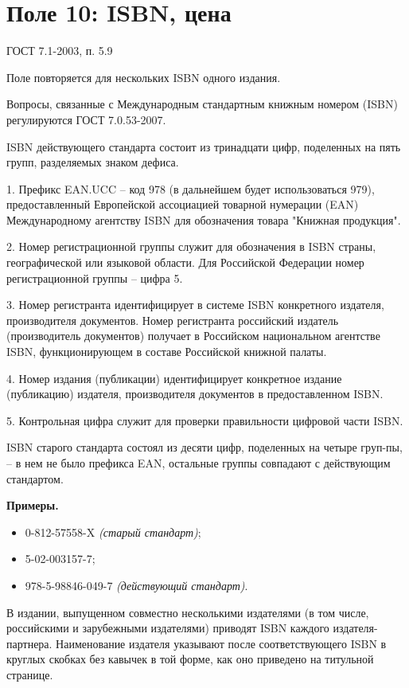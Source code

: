 \chapter*{Поле 10: ISBN, цена}

ГОСТ 7.1-2003, п. 5.9

Поле повторяется для нескольких ISBN одного издания.
 
Вопросы, связанные с Международным стандартным книжным номером (ISBN) регулируются ГОСТ 7.0.53-2007.

ISBN действующего стандарта состоит из тринадцати цифр, поделенных на пять групп, разделяемых знаком дефиса.

1.	Префикс EAN.UCC -- код 978 (в дальнейшем будет использоваться 979), предоставленный Европейской ассоциацией товарной нумерации (EAN) Международному агентству ISBN для обозначения товара "Книжная продукция".

2.	Номер регистрационной группы служит для обозначения в ISBN страны, географической или языковой области. Для Российской Федерации номер регистрационной группы -- цифра 5.

3.	Номер регистранта идентифицирует в системе ISBN конкретного издателя, производителя документов. Номер регистранта российский издатель (производитель документов) получает в Российском национальном агентстве ISBN, функционирующем в составе Российской книжной палаты.

4.	Номер издания (публикации) идентифицирует конкретное издание (публикацию) издателя, производителя документов в предоставленном ISBN.

5.	Контрольная цифра служит для проверки правильности цифровой части ISBN.

ISBN старого стандарта состоял из десяти цифр, поделенных на четыре груп-пы, – в нем не было префикса EAN, остальные группы совпадают с действующим стандартом.

\textbf{Примеры.}

\begin{itemize}
	\item 0-812-57558-X \textit{(старый стандарт)};
	\item 5-02-003157-7;
	\item 978-5-98846-049-7 \textit{(действующий стандарт)}.
\end{itemize}

В издании, выпущенном совместно несколькими издателями (в том числе, российскими и зарубежными издателями) приводят ISBN каждого издателя-партнера. Наименование издателя указывают после соответствующего ISBN в круглых скобках без кавычек в той форме, как оно приведено на титульной странице.

